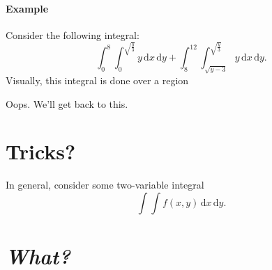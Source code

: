 \documentclass[11pt]{article}
\newcommand{\diff}{\mathrm d}
\begin{document}
\paragraph{Example}

Consider the following integral:
\[
    \int_0^8 \int_0^{\sqrt{\frac y 3}} y \, \diff x \, \diff y +
    \int_8^{12} \int_{\sqrt{y-3}}^{\sqrt{\frac y 3}} y \, \diff x \, \diff y.
\]
Visually, this integral is done over a region

Oops. We'll get back to this. 

\section*{Tricks?}

In general, consider some two-variable integral
\[
    \int \int f(x, y) \, \diff x \, \diff y.
\]



\section*{\emph{What?}}


\end{document}
